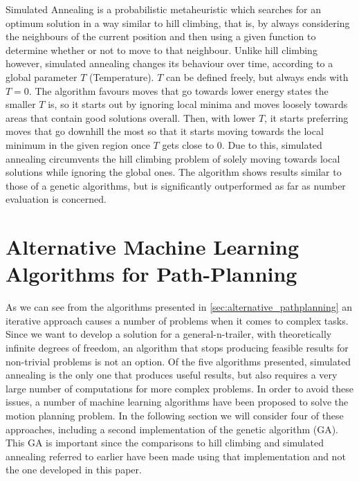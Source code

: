 Simulated Annealing is a probabilistic metaheuristic which searches for an optimum solution in a way similar to hill climbing, that is, by always considering the neighbours of the current position and then using a given function to determine whether or not to move to that neighbour. Unlike hill climbing however, simulated annealing changes its behaviour over time, according to a global parameter $T$ (Temperature). $T$ can be defined freely, but always ends with $T=0$. The algorithm favours moves that go towards lower energy states the smaller $T$ is, so it starts out by ignoring local minima and moves loosely towards areas that contain good solutions overall. Then, with lower $T$, it starts preferring moves that go downhill the most so that it starts moving towards the local minimum in the given region once $T$ gets close to $0$. Due to this, simulated annealing circumvents the hill climbing problem of solely moving towards local solutions while ignoring the global ones. The algorithm shows results similar to those of a genetic algorithms, but is significantly outperformed as far as number evaluation is concerned.\cite{8}


\section{Alternative Machine Learning Algorithms for Path-Planning}
\label{sec:alternative_machine_learning_pathplanning}

As we can see from the algorithms presented in \ref{sec:alternative_pathplanning} an iterative approach causes a number of problems when it comes to complex tasks. Since we want to develop a solution for a general-n-trailer, with theoretically infinite degrees of freedom, an algorithm that stops producing feasible results for non-trivial problems is not an option. Of the five algorithms presented, simulated annealing is the only one that produces useful results, but also requires a very large number of computations \cite{8} for more complex problems. In order to avoid these issues, a number of machine learning algorithms have been proposed to solve the motion planning problem. In the following section we will consider four of these approaches, including a second implementation of the genetic algorithm (GA). This GA is important since the comparisons to hill climbing and simulated annealing referred to earlier have been made using that implementation and not the one developed in this paper. \cite{8}

